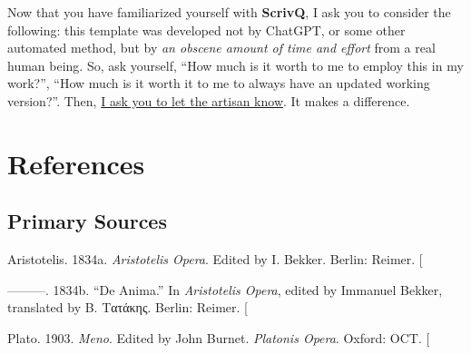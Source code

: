 \documentclass[
  12pt,
  a4paper,
  oneside,
  numbers=noenddot,
  titlepage,
  toclink=all,
  toc=bibliography]{scrbook}
\newlength{\cslhangindent}
\newlength{\cslentryspacingunit} %
\newenvironment{CSLReferences}[2] %
 {%
  \setlength{\parindent}{0pt}
  \ifodd #1
  \let\oldpar\par
  \def\par{\hangindent=\cslhangindent\oldpar}
  \fi
  \setlength{\parskip}{#2\cslentryspacingunit}
 }%
 {}
\theoremstyle{definition}
\theoremstyle{definition}
\theoremstyle{definition}
\theoremstyle{plain}
\theoremstyle{plain}
\theoremstyle{plain}
\theoremstyle{plain}
\theoremstyle{plain}
\theoremstyle{remark}
\begin{document}
\begin{tcolorbox}[enhanced jigsaw, arc=.35mm, left=2mm, colframe=quarto-callout-note-color-frame, bottomrule=.15mm, toprule=.15mm, colback=white, breakable, opacityback=0, rightrule=.15mm, leftrule=.75mm]
\begin{minipage}[t]{5.5mm}
\textcolor{quarto-callout-note-color}{\faInfo}
\end{minipage}%
\begin{minipage}[t]{\textwidth - 5.5mm}

Now that you have familiarized yourself with \textbf{ScrivQ}, I ask you
to consider the following: this template was developed not by ChatGPT,
or some other automated method, but by \emph{an obscene amount of time
and effort} from a real human being. So, ask yourself, \enquote{How much
is it worth to me to employ this in my work?}, \enquote{How much is it
worth it to me to always have an updated working version?}. Then,
\href{https://github.com/sponsors/bcdavasconcelos}{I ask you to let the
artisan know}. It makes a difference.

\end{minipage}%
\end{tcolorbox}

\hypertarget{sec-scriv69}{%
\chapter{References}\label{sec-scriv69}}

\hypertarget{sec-scriv70}{%
\section{Primary Sources}\label{sec-scriv70}}

\hypertarget{refs_scriv70}{}
\begin{CSLReferences}{1}{0}
\leavevmode{}%
Aristotelis. 1834a. \emph{Aristotelis Opera}. Edited by I. Bekker.
Berlin: Reimer. {[}\Acrobatmenu{GoBack}{$\hookleftarrow$}{]}

\leavevmode{}%
---------. 1834b. {``De Anima.''} In \emph{Aristotelis Opera}, edited by
Immanuel Bekker, translated by Β. Τατάκης. Berlin: Reimer.
{[}\Acrobatmenu{GoBack}{$\hookleftarrow$}{]}

\leavevmode{}%
Plato. 1903. \emph{Meno}. Edited by John Burnet. \emph{Platonis Opera}.
Oxford: OCT. {[}\Acrobatmenu{GoBack}{$\hookleftarrow$}{]}

\end{CSLReferences}
\end{document}
